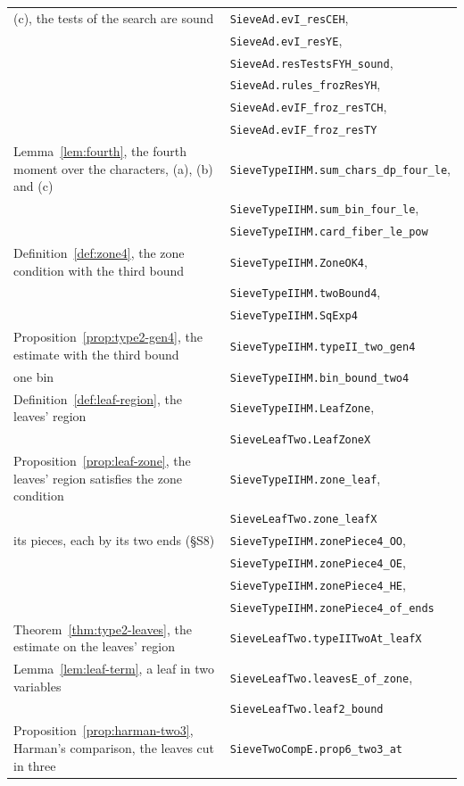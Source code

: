 \documentclass[11pt]{article}
\theoremstyle{definition}
\newcommand{\lean}[1]{\texttt{#1}}
\begin{document}
{\begin{longtable}{@{}>{\raggedright\arraybackslash}p{}l@{}}
\quad (c), the tests of the search are sound & \lean{SieveAd.evI\_resCEH}, \\
 & \lean{SieveAd.evI\_resYE}, \\
 & \lean{SieveAd.resTestsFYH\_sound}, \\
 & \lean{SieveAd.rules\_frozResYH}, \\
 & \lean{SieveAd.evIF\_froz\_resTCH}, \\
 & \lean{SieveAd.evIF\_froz\_resTY} \\
Lemma~\ref{lem:fourth}, the fourth moment over the characters, (a), (b) and (c) &
\lean{SieveTypeIIHM.sum\_chars\_dp\_four\_le}, \\
 & \lean{SieveTypeIIHM.sum\_bin\_four\_le}, \\
 & \lean{SieveTypeIIHM.card\_fiber\_le\_pow} \\
Definition~\ref{def:zone4}, the zone condition with the third bound & \lean{SieveTypeIIHM.ZoneOK4}, \\
 & \lean{SieveTypeIIHM.twoBound4}, \\
 & \lean{SieveTypeIIHM.SqExp4} \\
Proposition~\ref{prop:type2-gen4}, the estimate with the third bound & \lean{SieveTypeIIHM.typeII\_two\_gen4} \\
\quad one bin & \lean{SieveTypeIIHM.bin\_bound\_two4} \\
Definition~\ref{def:leaf-region}, the leaves' region & \lean{SieveTypeIIHM.LeafZone}, \\
 & \lean{SieveLeafTwo.LeafZoneX} \\
Proposition~\ref{prop:leaf-zone}, the leaves' region satisfies the zone condition & \lean{SieveTypeIIHM.zone\_leaf}, \\
 & \lean{SieveLeafTwo.zone\_leafX} \\
\quad its pieces, each by its two ends (\S S8) & \lean{SieveTypeIIHM.zonePiece4\_OO}, \\
 & \lean{SieveTypeIIHM.zonePiece4\_OE}, \\
 & \lean{SieveTypeIIHM.zonePiece4\_HE}, \\
 & \lean{SieveTypeIIHM.zonePiece4\_of\_ends} \\
Theorem~\ref{thm:type2-leaves}, the estimate on the leaves' region & \lean{SieveLeafTwo.typeIITwoAt\_leafX} \\
Lemma~\ref{lem:leaf-term}, a leaf in two variables & \lean{SieveLeafTwo.leavesE\_of\_zone}, \\
 & \lean{SieveLeafTwo.leaf2\_bound} \\
Proposition~\ref{prop:harman-two3}, Harman's comparison, the leaves cut in three & \lean{SieveTwoCompE.prop6\_two3\_at}

\end{longtable}}
\end{document}
